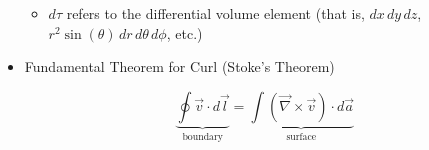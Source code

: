 \begin{itemize}
    \begin{itemize}

      \item $d\tau$ refers to the differential volume element (that is, $dx\,dy\,dz$, $r^2\sin(\theta)\,dr\,d\theta\,d\phi$, etc.)

    \end{itemize}

  \item Fundamental Theorem for Curl (Stoke's Theorem)

    $$\underbrace{\oint\vec{v}\cdot d\vec{l}}_{\text{boundary}}=\underbrace{\int(\vec{\nabla}\times\vec{v})\cdot d\vec{a}}_{\text{surface}}$$

\end{itemize}



